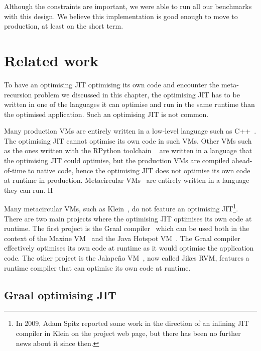 \documentclass[a4paper,12pt,twoside]{../includes/ThesisStyle}
\begin{document}
Although the constraints are important, we were able to run all our benchmarks with this design. We believe this implementation is good enough to move to production, at least on the short term.


\section{Related work}
\label{sec:recRelW}

To have an optimising JIT optimising its own code and encounter the meta-recursion problem we discussed in this chapter, the optimising JIT has to be written in one of the languages it can optimise and run in the same runtime than the optimised application. Such an optimising JIT is not common.

Many production VMs are entirely written in a low-level language such as C++~\cite{V8,Webkit15}. The optimising JIT cannot optimise its own code in such VMs. Other VMs such as the ones written with the RPython toolchain ~\cite{Rigo06a} are written in a language that the optimising JIT could optimise, but the production VMs are compiled ahead-of-time to native code, hence the optimising JIT does not optimise its own code at runtime in production. Metacircular VMs~\cite{Unga05b,Alp99a} are entirely written in a language they can run. H

Many metacircular VMs, such as Klein~\cite{Unga05b}, do not feature an optimising JIT\footnote{In 2009, Adam Spitz reported some work in the direction of an inlining JIT compiler in Klein on the project web page, but there has been no further news about it since then.}. There are two main projects where the optimising JIT optimises its own code at runtime. The first project is the Graal compiler~\cite{Oracle13,Dubo13c} which can be used both in the context of the Maxine VM~\cite{Wimm13a} and the Java Hotspot VM~\cite{Pale01a}. The Graal compiler effectively optimises its own code at runtime as it would optimise the application code. The other project is the Jalape\~no VM~\cite{Alp99a}, now called Jikes RVM, features a runtime compiler that can optimise its own code at runtime. 

\subsection{Graal optimising JIT}
\end{document}
